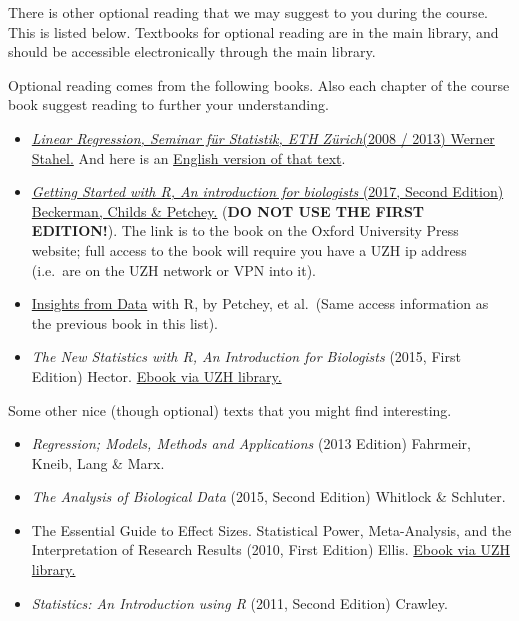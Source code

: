 \documentclass[
  letterpaper,
  8pt,
  a4paper]{book}
\providecommand{\tightlist}{%
  \setlength{\itemsep}{0pt}\setlength{\parskip}{0pt}}
\begin{document}
There is other optional reading that we may suggest to you during the
course. This is listed below. Textbooks for optional reading are in the
main library, and should be accessible electronically through the main
library.

Optional reading comes from the following books. Also each chapter of
the course book suggest reading to further your understanding.

\begin{itemize}
\tightlist
\item
  \href{https://github.com/opetchey/BIO144/raw/master/9_assets/Stahel_LinReg.pdf}{\emph{Linear
  Regression, Seminar für Statistik, ETH Zürich}(2008 / 2013) Werner
  Stahel.} And here is an
  \href{https://github.com/opetchey/BIO144/raw/master/9_assets/Stahel_LinReg_EN.pdf}{English
  version of that text}.
\item
  \href{https://academic.oup.com/book/27290}{\emph{Getting Started with
  R, An introduction for biologists} (2017, Second Edition) Beckerman,
  Childs \& Petchey.} (\textbf{DO NOT USE THE FIRST EDITION!}). The link
  is to the book on the Oxford University Press website; full access to
  the book will require you have a UZH ip address (i.e.~are on the UZH
  network or VPN into it).
\item
  \href{https://academic.oup.com/book/39565}{Insights from Data} with R,
  by Petchey, et al.~(Same access information as the previous book in
  this list).
\item
  \emph{The New Statistics with R, An Introduction for Biologists}
  (2015, First Edition) Hector.
  \href{https://academic.oup.com/book/32474}{Ebook via UZH library.}
\end{itemize}

Some other nice (though optional) texts that you might find interesting.

\begin{itemize}
\item
  \emph{Regression; Models, Methods and Applications} (2013 Edition)
  Fahrmeir, Kneib, Lang \& Marx.
\item
  \emph{The Analysis of Biological Data} (2015, Second Edition) Whitlock
  \& Schluter.
\item
  The Essential Guide to Effect Sizes. Statistical Power, Meta-Analysis,
  and the Interpretation of Research Results (2010, First Edition)
  Ellis.
  \href{http://ezproxy.uzh.ch/login?url=http://dx.doi.org/10.1017/CBO9780511761676}{Ebook
  via UZH library.}
\item
  \emph{Statistics: An Introduction using R} (2011, Second Edition)
  Crawley.
\end{itemize}
\end{document}
